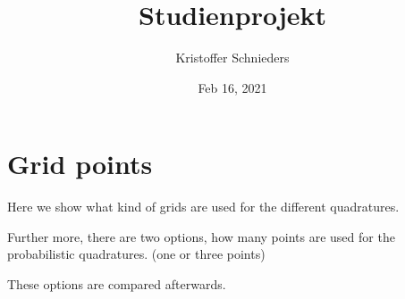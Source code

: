 \documentclass[letterpaper,10pt,english]{sphinxmanual}
\title{Studienprojekt}
\date{Feb 16, 2021}
\author{Kristoffer Schnieders}
\begin{document}
\pagestyle{empty}
\sphinxmaketitle
\pagestyle{plain}
\sphinxtableofcontents
\pagestyle{normal}
\label{\detokenize{index::doc}}



\chapter{Grid points}
\label{\detokenize{examples/Grid_points:Grid-points}}\label{\detokenize{examples/Grid_points::doc}}
Here we show what kind of grids are used for the different quadratures.

Further more, there are two options, how many points are used for the probabilistic quadratures. (one or three points)

These options are compared afterwards.

{
\begin{sphinxVerbatim}[commandchars=\\\{\}]
\llap{\color{nbsphinxin}[1]:\,\hspace{\fboxrule}\hspace{\fboxsep}}   
 
   
\end{sphinxVerbatim}
}
\end{document}
